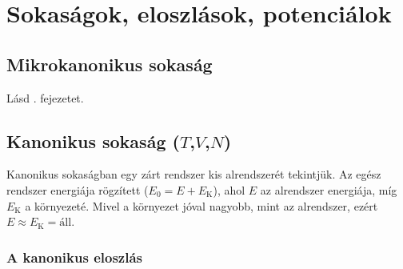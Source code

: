 \chapter{Sokas\'agok, eloszl\'asok, potenci\'alok}
 
 \section{Mikrokanonikus sokaság}
  
  Lásd . fejezetet.
  
 \section{Kanonikus sokaság ($T$,$V$,$N$)}
  
  Kanonikus sokaságban egy zárt rendszer kis alrendszerét tekintjük.
   Az egész rendszer energiája rögzített ($E_0=E+E_\text{K}$), ahol $E$ az alrendszer energiája, míg $E_\text{K}$ a környezeté.
   Mivel a környezet jóval nagyobb, mint az alrendszer, ezért $E\approx E_\text{K}=\text{áll}$. 
  
  \subsection{A kanonikus eloszlás}
   

